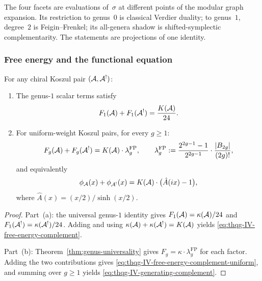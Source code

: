 \begin{remark}
\label{rem:thqg-IV-single-functor}
The four facets are evaluations of~$\sigma$ at different
points of the modular graph expansion. Its restriction to genus~$0$
is classical Verdier duality; to genus~$1$, degree~$2$ is
Feigin--Frenkel; its all-genera shadow is shifted-symplectic
complementarity. The statements are projections of one identity.
\end{remark}

\subsubsection{Free energy and the functional equation}

\begin{theorem}
\label{thm:thqg-IV-free-energy}
For any chiral Koszul pair $(\mathcal{A}, \mathcal{A}^!)$:
\begin{enumerate}[label=\textup{(\alph*)}]
\item The genus-$1$ scalar terms satisfy
\begin{equation}\label{eq:thqg-IV-free-energy-complement}
F_1(\mathcal{A}) + F_1(\mathcal{A}^!)
= \frac{K(\mathcal{A})}{24}.
\end{equation}
\item For uniform-weight Koszul pairs, for every $g \geq 1$:
\begin{equation}\label{eq:thqg-IV-free-energy-complement-uniform}
F_g(\mathcal{A}) + F_g(\mathcal{A}^!)
= K(\mathcal{A}) \cdot \lambda_g^{\mathrm{FP}},
\qquad
\lambda_g^{\mathrm{FP}}
:= \frac{2^{2g-1}-1}{2^{2g-1}} \cdot \frac{|B_{2g}|}{(2g)!},
\end{equation}
and equivalently
\begin{equation}\label{eq:thqg-IV-generating-complement}
\phi_{\mathcal{A}}(x) + \phi_{\mathcal{A}^!}(x)
= K(\mathcal{A}) \cdot \bigl(\hat{A}(ix) - 1\bigr),
\end{equation}
where $\hat{A}(x) = (x/2)/\sinh(x/2)$.
\end{enumerate}
\end{theorem}

\begin{proof}
Part~(a): the universal genus-$1$ identity gives
$F_1(\mathcal{A}) = \kappa(\mathcal{A})/24$ and
$F_1(\mathcal{A}^!) = \kappa(\mathcal{A}^!)/24$.
Adding and using $\kappa(\mathcal{A}) + \kappa(\mathcal{A}^!) = K(\mathcal{A})$ yields
\eqref{eq:thqg-IV-free-energy-complement}.

Part~(b): Theorem~\ref{thm:genus-universality} gives
$F_g = \kappa \cdot \lambda_g^{\mathrm{FP}}$ for each factor.
Adding the two contributions gives
\eqref{eq:thqg-IV-free-energy-complement-uniform}, and summing over
$g \geq 1$ yields
\eqref{eq:thqg-IV-generating-complement}.
\end{proof}

